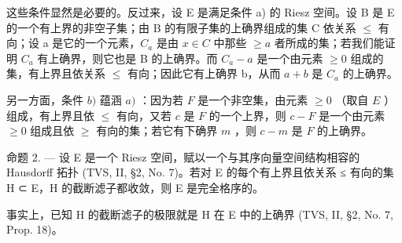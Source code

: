 这些条件显然是必要的。反过来，设 E 是满足条件 a) 的 Riesz 空间。设 B 是 E 的一个有上界的非空子集；由 B 的有限子集的上确界组成的集 C 依关系 \(\leqslant\) 有向；设 a 是它的一个元素，\(C_{a}\) 是由 \(x \in C\) 中那些 \(\geqslant a\) 者所成的集；若我们能证明 \(C_{a}\) 有上确界，则它也是 B 的上确界。而 \(C_{a} - a\) 是一个由元素 \(\geqslant 0\) 组成的集，有上界且依关系 \(\leqslant\) 有向；因此它有上确界 b，从而 \(a + b\) 是 \(C_{a}\) 的上确界。

另一方面，条件 \(b)\) 蕴涵 \(a)\) ：因为若 \(F\) 是一个非空集，由元素 \(\geqslant 0\) （取自 \(E\) ）组成，有上界且依 \(\leqslant\) 有向，又若 \(c\) 是 \(F\) 的一个上界，则 \(c - F\) 是一个由元素 \(\geqslant 0\) 组成且依 \(\geqslant\) 有向的集；若它有下确界 \(m\) ，则 \(c - m\) 是 \(F\) 的上确界。

命题 2. --- 设 E 是一个 Riesz 空间，赋以一个与其序向量空间结构相容的 Hausdorff 拓扑 (TVS, II, §2, No. 7)。若对 E 的每个有上界且依关系 ≤ 有向的集 H ⊂ E，H 的截断滤子都收敛，则 E 是完全格序的。

事实上，已知 H 的截断滤子的极限就是 H 在 E 中的上确界 (TVS, II, §2, No. 7, Prop. 18)。

